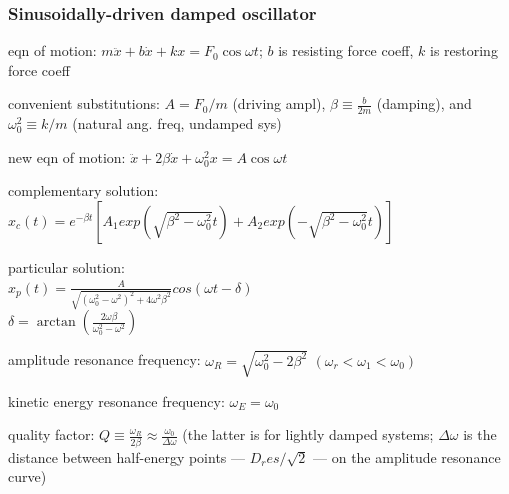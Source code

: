 \documentclass[letterpaper,landscape,10pt]{article}
\newenvironment{mydescription}
{\begin{description}
	\setlength{\itemsep}{0pt}
	\setlength{\parskip}{0pt}
	\setlength{\parsep}{-1pt}}
{\end{description}}
\begin{document}
{\begin{multicols}{4}
    \subsubsection*{Sinusoidally-driven damped oscillator}
    	\begin{mydescription}
    		\item[eqn of motion:]
    			$m\ddot{x} + b\dot{x} + kx = F_0\cos\omega t$;
    			$b$ is resisting force coeff, $k$ is restoring force coeff  \\
    		\item[convenient substitutions:]
    			$A=F_0/m$ (driving ampl), $\beta \equiv \frac{b}{2m}$
    			(damping), and $\omega_0^2 \equiv k/m$ (natural ang. freq,
    			undamped sys)  \\
    		\item[new eqn of motion:]
    			$\ddot{x} + 2\beta\dot{x} + \omega_0^2x = A\cos\omega t$  \\
    		\item[complementary solution:]
    			$ x_c(t) = e^{-\beta t}\left[ A_1exp\left(
    				\sqrt{\beta^2-\omega_0^2}t\right) + A_2exp\left(
    				-\sqrt{\beta^2-\omega_0^2}t\right) \right] $\\
    		\item[particular solution:] \ \\
    			$ x_p(t)=\frac{A}{\sqrt{\left(
    				\omega_0^2-\omega^2\right)^2+4\omega^2\beta^2}} cos(\omega
    				t-\delta) $\\
    			$ \delta = \arctan\left( \frac{2\omega\beta}{\omega_0^2 -
    				\omega^2} \right) $
    		\item[amplitude resonance frequency:]
    			$\omega_R = \sqrt{\omega_0^2-2\beta^2} \,\, (\omega_r <
    			\omega_1 < \omega_0)$ \\
    		\item[kinetic energy resonance frequency:]
    			$\omega_E = \omega_0$ \\
    		\item[quality factor:]
    			$Q \equiv \frac{\omega_R}{2\beta} \approx
    			\frac{\omega_0}{\Delta\omega}$ (the latter is for lightly
    			damped systems; $\Delta\omega$ is the distance between
    			half-energy points --- $D_res/\sqrt{2}$ --- on the amplitude
    			resonance curve) \\
    	\end{mydescription}
    

\end{multicols}}
\end{document}
